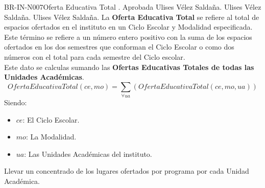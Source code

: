 \begin{BusinessRule}{BR-IN-N007}{Oferta Educativa Total}
	{\bcDerivation}    %
	{\btEnabler}     %
	{\blControlling}    %
	.
	\BRItem[Estado] Aprobada
	 Ulises Vélez Saldaña.
	 Ulises Vélez Saldaña.
	 Ulises Vélez Saldaña.
	\BRItem[Descripción] La {\bf Oferta Educativa Total} se refiere al total de espacios ofertados en el instituto en un Ciclo Escolar y Modalidad especificada.\\ 
	Este término se refiere a un número entero positivo con la suma de los espacios ofertados en los dos semestres que conforman el Ciclo Escolar o como dos números con el total para cada semestre del Ciclo escolar.\\
	 Este dato se calculas sumando las {\bf Ofertas Educativas Totales de todas las Unidades Académicas}.
	\BRItem[Sentencia] 
	\[OfertaEducativaTotal(ce, mo) = \sum_{\forall ua}\left(OfertaEducativaTotal(ce, mo, ua)\right)\]
	Siendo:	
        \begin{itemize}
			\item $ce$: El Ciclo Escolar.
			\item $mo$: La Modalidad.
        	\item $ua$: Las Unidades Académicas del instituto.
        \end{itemize}
	\BRItem[Motivación] Llevar un concentrado de los lugares ofertados por programa por cada Unidad Académica.
\end{BusinessRule}

